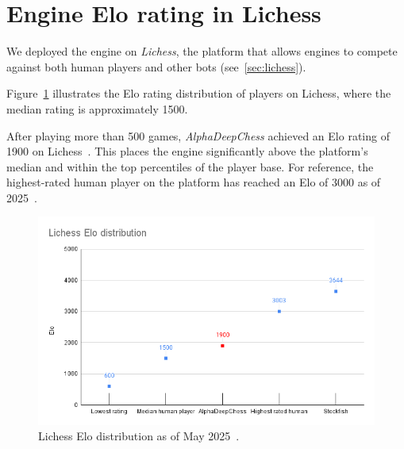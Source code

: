 \newpage

\section{Engine Elo rating in Lichess}

\noindent We deployed the engine on \textit{Lichess}, the platform that allows engines to compete against both human players and other bots (see~\cref{sec:lichess}).

\vspace{1em}

\noindent Figure~\ref{fig:eloDistribution} illustrates the Elo rating distribution of players on Lichess, where the median rating is approximately 1500.
\vspace{1em}

\noindent After playing more than 500 games, \textit{AlphaDeepChess} achieved an Elo rating of 1900 on Lichess~\cite{AlphaDeepChessElo}. This places the engine significantly above the platform's median and within the top percentiles of the player base. For reference, the highest-rated human player on the platform has reached an Elo of 3000 as of 2025~\cite{LichessBestPlayer}.

\begin{figure}
    \centering
    \includegraphics[width=0.95\linewidth]{Imagenes/eloDistribution.png}
    \caption{Lichess Elo distribution as of May 2025~\cite{LichessEloDistribution}.}
    \label{fig:eloDistribution}
\end{figure}